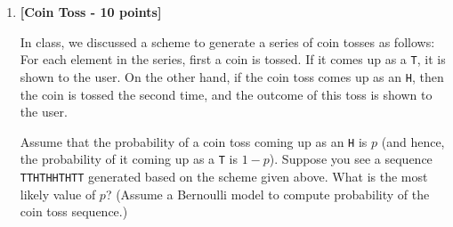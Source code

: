 \begin{enumerate}
Assume that the given data in Table~\ref{tab:poissonNBdata} is generated by a Poisson na\"ive Bayes model. You will use this
 data to develop a na\"ive Bayes predictor over Poisson distribution.
\begin{table}[!h]
\begin{center}
\begin{tabular}{|rp{1in}|rp{1in}|}
\hline
$\Pr(Y\tight{=}A)=$ & & $\Pr(Y\tight{=}B)=$ & \\ \hline
$\lambda^A_1=$ & & $\lambda^B_1=$ & \\ \hline
$\lambda^A_2=$ & & $\lambda^B_2=$ & \\ \hline
\end{tabular}
\caption{Parameters for Poisson na\"ive Bayes}
\label{tab:poissonNBparams}
\end{center}
\end{table}

\begin{enumerate}
\item {\bf [10 points]} Compute the prior probabilities and parameter values i.e. fill out Table~\ref{tab:poissonNBparams}.
\item {\bf [10 points]} Based on the parameter values from 
Table~\ref{tab:poissonNBparams}, compute
\begin{equation*}
\frac{\Pr(X_1\tight{=}2 , X_2\tight{=}3 \loose{|} Y\tight{=}A)}{\Pr(X_1\tight{=}2 , X_2\tight{=}3 \loose{|} Y\tight{=}B)}
\end{equation*}
\item {\bf [10 points]} (5 points each for two questions)
Derive an algebraic expression for the Poisson na\"ive Bayes predictor for $Y$ in terms of the 
parameters estimated from the data.

Use the parameters estimated from the data given in Table~\ref{tab:poissonNBdata} to 
create a Poisson na\"ive Bayes classifier. What will the classifier predict as the value of $Y$, given the data point:
$X_1\tight{=}2, X_2\tight{=}3$? 
\end{enumerate}



\item {\bf [Coin Toss - 10 points]}

In class, we discussed a scheme to generate a series of coin tosses as follows: For each element in the series, first a coin is tossed. If it comes up as a \texttt{T}, it is shown to the user. On the other hand, if the coin toss comes up as an \texttt{H}, then the coin is tossed the second time, and the outcome of this toss is shown to the user.

Assume that the probability of a coin toss coming up as an \texttt{H} is $p$ (and hence, the probability of it coming up as a \texttt{T} is $1-p$). Suppose you see a sequence \texttt{TTHTHHTHTT} generated based on the scheme given above.  What is the most likely value of $p$? (Assume a Bernoulli model to compute probability of the coin toss sequence.)
\end{enumerate}

